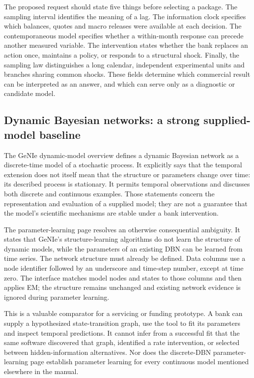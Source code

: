 The proposed request should state five things before selecting a
package. The sampling interval identifies the meaning of a lag. The
information clock specifies which balances, quotes and macro releases
were available at each decision. The contemporaneous model specifies
whether a within-month response can precede another measured variable.
The intervention states whether the bank replaces an action once,
maintains a policy, or responds to a structural shock. Finally, the
sampling law distinguishes a long calendar, independent experimental
units and branches sharing common shocks. These fields determine which
commercial result can be interpreted as an answer, and which can serve
only as a diagnostic or candidate model.

\hypertarget{dynamic-bayesian-networks-a-strong-supplied-model-baseline}{%
\subsection{Dynamic Bayesian networks: a strong supplied-model
baseline}\label{dynamic-bayesian-networks-a-strong-supplied-model-baseline}}

The GeNIe dynamic-model overview defines a dynamic Bayesian network as a
discrete-time model of a stochastic process. It explicitly says that the
temporal extension does not itself mean that the structure or parameters
change over time: its described process is stationary. It permits
temporal observations and discusses both discrete and continuous
examples. Those statements concern the representation and evaluation of
a supplied model; they are not a guarantee that the model's scientific
mechanisms are stable under a bank
intervention.~\citep{exec13_ct_genie_dbn}

The parameter-learning page resolves an otherwise consequential
ambiguity. It states that GeNIe's structure-learning algorithms do not
learn the structure of dynamic models, while the parameters of an
existing DBN can be learned from time series. The network structure must
already be defined. Data columns use a node identifier followed by an
underscore and time-step number, except at time zero. The interface
matches model nodes and states to those columns and then applies EM; the
structure remains unchanged and existing network evidence is ignored
during parameter learning. \citep{exec13_ct_genie_learning}

This is a valuable comparator for a servicing or funding prototype. A
bank can supply a hypothesized state-transition graph, use the tool to
fit its parameters and inspect temporal predictions. It cannot infer
from a successful fit that the same software discovered that graph,
identified a rate intervention, or selected between hidden-information
alternatives. Nor does the discrete-DBN parameter-learning page
establish parameter learning for every continuous model mentioned
elsewhere in the manual.

